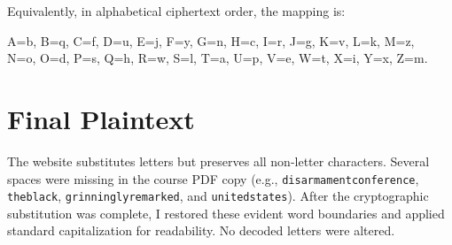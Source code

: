 \documentclass[11pt,a4paper]{article}
\begin{document}
Equivalently, in alphabetical ciphertext order, the mapping is:

\begin{center}
\small\ttfamily
A=b, B=q, C=f, D=u, E=j, F=y, G=n, H=c, I=r, J=g, K=v, L=k, M=z,\\
N=o, O=d, P=s, Q=h, R=w, S=l, T=a, U=p, V=e, W=t, X=i, Y=x, Z=m.
\end{center}

\newpage
\section{Final Plaintext}

The website substitutes letters but preserves all non-letter characters. Several spaces were missing in the course PDF copy (e.g., \texttt{disarmamentconference}, \texttt{theblack}, \texttt{grinninglyremarked}, and \texttt{unitedstates}). After the cryptographic substitution was complete, I restored these evident word boundaries and applied standard capitalization for readability. No decoded letters were altered.
\end{document}
